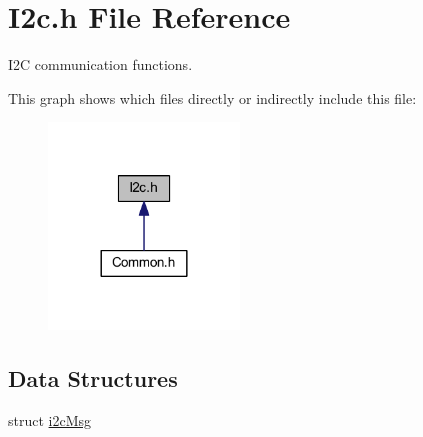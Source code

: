 \hypertarget{a00019}{\section{I2c.\-h File Reference}
\label{a00019}
}


I2\-C communication functions.  


This graph shows which files directly or indirectly include this file\-:\nopagebreak
\begin{figure}[H]
\begin{center}
\leavevmode
\includegraphics[width=144pt]{a00049}
\end{center}
\end{figure}
\subsection*{Data Structures}
\begin{DoxyCompactItemize}
\item 
struct \hyperlink{a00004}{i2c\-Msg}
\end{DoxyCompactItemize}
